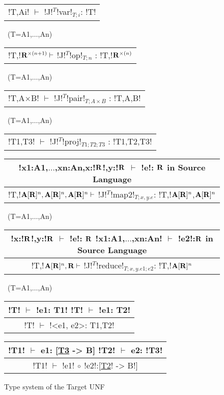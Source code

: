 \begin{figure*}[tb]
    \centering
    \begin{tabular}{c} 
        \\\hline
        !T,Ai! $\vdash$ !J!$^T$!var!$_{T;i}$: !T!
        \end{tabular}~(T=A1,$\ldots$,An)
        \hspace{0.5cm}
        \begin{tabular}{c}
            \\\hline
            !T,!$\mathbf{R}^{\times(n+1)} \vdash$ !J!$^T$!op!$_{T;n}$ : !T,!$\mathbf{R}^{\times(n)}$
        \end{tabular}~(T=A1,$\ldots$,An)
    
        \begin{tabular}{c}
            \\\hline
            !T,A$\times$B! $\vdash$ !J!$^T$!pair!$_{T;A\times B}$ : !T,A,B!
        \end{tabular}~(T=A1,$\ldots$,An)
    
        \begin{tabular}{c}
            \\\hline
            !T1,T3! $\vdash$ !J!$^T$!proj!$_{T1;T2;T3}$ : !T1,T2,T3!
        \end{tabular}
    
        \begin{tabular}{c}
            !x1:A1,$\ldots$,xn:An,x:!$\mathbf{R}$!,y:!$\mathbf{R}$ $\vdash$ !e!: $\mathbf{R}$ \quad in Source Language
            \\\hline  
            !T,!$\mathbf{A}[\mathbf{R}]^{n},\mathbf{A}[\mathbf{R}]^{n},\mathbf{A}[\mathbf{R}]^{n} \vdash$ !J!$^T$!map2!$_{T; x,y.e}$: !T,!$\mathbf{A}[\mathbf{R}]^{n}$,$\mathbf{A}[\mathbf{R}]^{n}$
        \end{tabular}~(T=A1,$\ldots$,An)
    
        \begin{tabular}{c}
            !x:!$\mathbf{R}$!,y:!$\mathbf{R}$ $\vdash$ !e!: $\mathbf{R}$ \quad !x1:A1,$\ldots$,xn:An! $\vdash$ !e2!:$\mathbf{R}$ \quad in Source Language
            \\\hline  
            !T,!$\mathbf{A}[\mathbf{R}]^{n},\mathbf{R} \vdash$ !J!$^T$!reduce!$_{T; x,y.e1; e2}$: !T,!$\mathbf{A}[\mathbf{R}]^{n}$
        \end{tabular}~(T=A1,$\ldots$,An)

        \begin{tabular}{c}
            !T! $\vdash$ !e1: T1!  \quad !T! $\vdash$ !e1: T2!
            \\ \hline
            !T! $\vdash$ !<e1, e2>: T1,T2!
        \end{tabular}
        \hspace{0.5cm}
        \begin{tabular}{c}
            !T1! $\vdash$ e1: [\underline{T3} -> B]  \quad !T2! $\vdash$ e2: !T3! 
            \\ \hline
            !T1! $\vdash$ !e1! $\circ$ !e2!:[\underline{T2}! -> B!]
        \end{tabular}

    \vspace{-0.2cm}
    \caption{Type system of the Target UNF}
    \vspace{-0.4cm}
    \label{fig:target_unf_typesystem}
    \end{figure*}